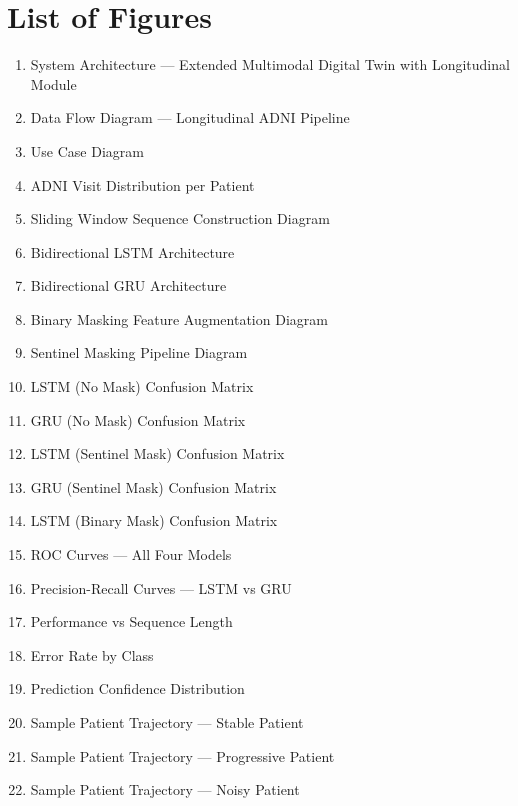 \documentclass[12pt,singleside,a4paper]{article}
\begin{document}
\section*{List of Figures}
\begin{enumerate}
    \item System Architecture — Extended Multimodal Digital Twin with Longitudinal Module
    \item Data Flow Diagram — Longitudinal ADNI Pipeline
    \item Use Case Diagram
    \item ADNI Visit Distribution per Patient
    \item Sliding Window Sequence Construction Diagram
    \item Bidirectional LSTM Architecture
    \item Bidirectional GRU Architecture
    \item Binary Masking Feature Augmentation Diagram
    \item Sentinel Masking Pipeline Diagram
    \item LSTM (No Mask) Confusion Matrix
    \item GRU (No Mask) Confusion Matrix
    \item LSTM (Sentinel Mask) Confusion Matrix
    \item GRU (Sentinel Mask) Confusion Matrix
    \item LSTM (Binary Mask) Confusion Matrix
    \item ROC Curves — All Four Models
    \item Precision-Recall Curves — LSTM vs GRU
    \item Performance vs Sequence Length
    \item Error Rate by Class
    \item Prediction Confidence Distribution
    \item Sample Patient Trajectory — Stable Patient
    \item Sample Patient Trajectory — Progressive Patient
    \item Sample Patient Trajectory — Noisy Patient
\end{enumerate}

\pagebreak
\end{document}
